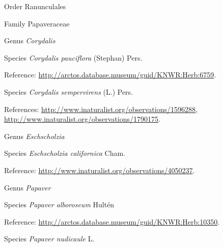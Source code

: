 \documentclass[9pt, article]{memoir}
\begin{document}
\begin{multicols}{2}
\vspace{6pt}\noindent\hspace{18pt}Order Ranunculales


\vspace{6pt}\noindent\hspace{24pt}Family Papaveraceae


\vspace{6pt}\noindent\hspace{30pt}Genus \textit{Corydalis}


\vspace{6pt}\noindent\hspace{36pt}Species \textit{Corydalis pauciflora} (Stephan) Pers.


\vspace{6pt}Reference: 
\url{http://arctos.database.museum/guid/KNWR:Herb:6759}.

\vspace{6pt}\noindent\hspace{36pt}Species \textit{Corydalis sempervirens} (L.) Pers.


\vspace{6pt}References: 
\url{http://www.inaturalist.org/observations/1596288}, 
\url{http://www.inaturalist.org/observations/1790175}.

\vspace{6pt}\noindent\hspace{30pt}Genus \textit{Eschscholzia}


\vspace{6pt}\noindent\hspace{36pt}Species \textit{Eschscholzia californica} Cham.


\vspace{6pt}Reference: 
\url{http://www.inaturalist.org/observations/4050237}.

\vspace{6pt}\noindent\hspace{30pt}Genus \textit{Papaver}


\vspace{6pt}\noindent\hspace{36pt}Species \textit{Papaver alboroseum} Hultén


\vspace{6pt}Reference: 
\url{http://arctos.database.museum/guid/KNWR:Herb:10350}.

\vspace{6pt}\noindent\hspace{36pt}Species \textit{Papaver nudicaule} L.



\end{multicols}
\end{document}

